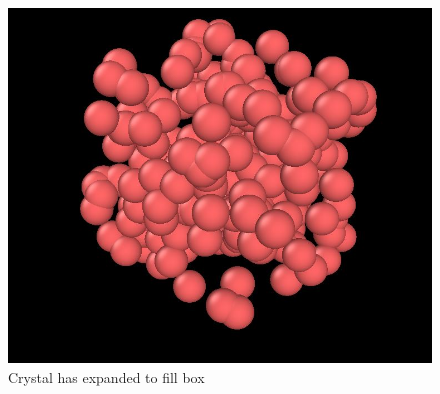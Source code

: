 \begin{figure}[h!]
        \centering 
        \includegraphics[scale=0.6]{./py/3di_2_ovito.jpg} 
        \caption{Crystal has expanded to fill box}
        \label{fig:3di_2}
\end{figure}


